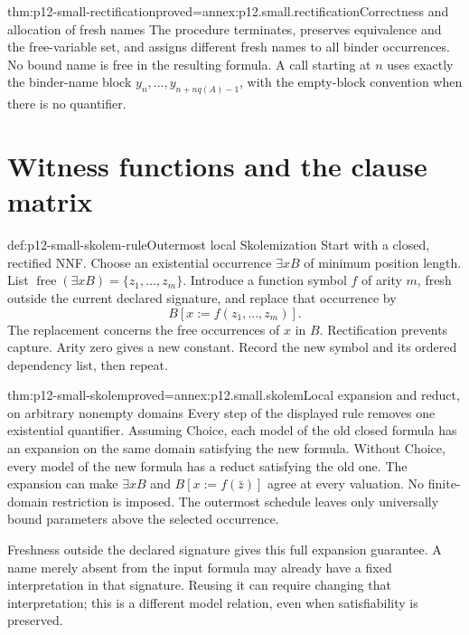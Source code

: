 \begin{hbtheorem}{thm:p12-small-rectification}{proved=annex:p12.small.rectification}{Correctness and allocation of fresh names}
The procedure terminates, preserves equivalence and the free-variable
set, and assigns different fresh names to all binder occurrences.
No bound name is free in the resulting formula.
A call starting at \(n\) uses exactly the binder-name block
\(y_n,\ldots,y_{n+nq(A)-1}\), with the empty-block convention
when there is no quantifier.
\end{hbtheorem}

\section{Witness functions and the clause matrix}

\begin{hbmethod}{def:p12-small-skolem-rule}{Outermost local Skolemization}
Start with a closed, rectified NNF. Choose an existential
occurrence \(\exists x B\) of minimum position length.
List \(\operatorname{free}(\exists x B)=\{z_1,\ldots,z_m\}\).
Introduce a function symbol \(f\) of arity \(m\), fresh outside
the current declared signature, and replace that occurrence by
\[
                         B[x:=f(z_1,\ldots,z_m)] .
\]
The replacement concerns the free occurrences of \(x\) in \(B\).
Rectification prevents capture. Arity zero gives a new constant.
Record the new symbol and its ordered dependency list, then repeat.
\end{hbmethod}

\begin{hbtheorem}{thm:p12-small-skolem}{proved=annex:p12.small.skolem}{Local expansion and reduct, on arbitrary nonempty domains}
Every step of the displayed rule removes one existential quantifier.
Assuming Choice, each model of the old closed formula has an
expansion on the same domain satisfying the new formula.
Without Choice, every model of the new formula has a reduct
satisfying the old one. The expansion can make
\(\exists x B\) and \(B[x:=f(\bar z)]\) agree at every valuation.
No finite-domain restriction is imposed.
The outermost schedule leaves only universally bound parameters
above the selected occurrence.

Freshness outside the declared signature gives this full
expansion guarantee. A name merely absent from the input formula
may already have a fixed interpretation in that signature.
Reusing it can require changing that interpretation; this is
a different model relation, even when satisfiability is preserved.
\end{hbtheorem}

